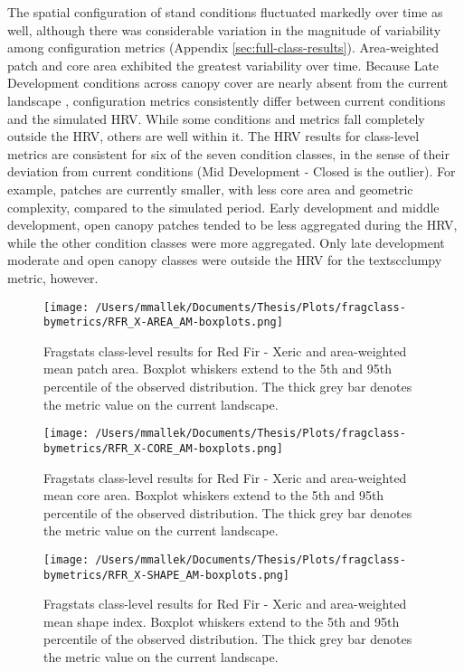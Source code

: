 The spatial configuration of stand conditions fluctuated markedly over time as well, although there was considerable variation in the magnitude of variability among configuration metrics (Appendix \ref{sec:full-class-results}). Area-weighted patch and core area exhibited the greatest variability over time. Because Late Development conditions across canopy cover are nearly absent from the current landscape , configuration metrics consistently differ between current conditions and the simulated HRV. While some conditions and metrics fall completely outside the HRV, others are well within it. The HRV results for class-level metrics are consistent for six of the seven condition classes, in the sense of their deviation from current conditions (Mid Development - Closed is the outlier). For example, patches are currently smaller, with less core area and geometric complexity, compared to the simulated period. Early development and middle development, open canopy patches tended to be less aggregated during the HRV, while the other condition classes were more aggregated. Only late development moderate and open canopy classes were outside the HRV for the textsc{clumpy} metric, however.

\begin{figure}[!htbp]
\centering
    \texttt{[image: /Users/mmallek/Documents/Thesis/Plots/fragclass-bymetrics/RFR\_X-AREA\_AM-boxplots.png]}
  \caption{Fragstats class-level results for Red Fir - Xeric and area-weighted mean patch area. Boxplot whiskers extend to the 5th and 95th percentile of the observed distribution. The thick grey bar denotes the metric value on the current landscape.}
  \label{fig:rfrx_areaam}
\end{figure}


\begin{figure}[!htbp]
\centering
    \texttt{[image: /Users/mmallek/Documents/Thesis/Plots/fragclass-bymetrics/RFR\_X-CORE\_AM-boxplots.png]}
  \caption{Fragstats class-level results for Red Fir - Xeric and area-weighted mean core area. Boxplot whiskers extend to the 5th and 95th percentile of the observed distribution. The thick grey bar denotes the metric value on the current landscape.}
  \label{fig:rfrx_coream}
\end{figure}


\begin{figure}[!htbp]
\centering
    \texttt{[image: /Users/mmallek/Documents/Thesis/Plots/fragclass-bymetrics/RFR\_X-SHAPE\_AM-boxplots.png]}
  \caption{Fragstats class-level results for Red Fir - Xeric and area-weighted mean shape index. Boxplot whiskers extend to the 5th and 95th percentile of the observed distribution. The thick grey bar denotes the metric value on the current landscape.}
  \label{fig:rfrx_shapeam}
\end{figure}


